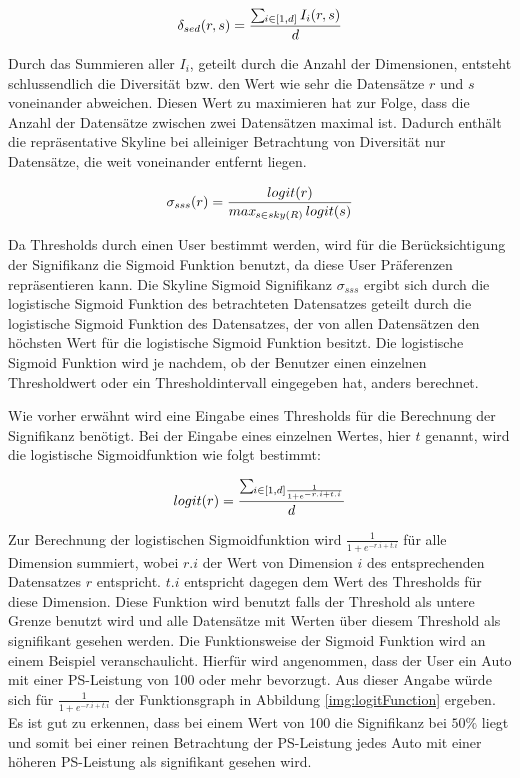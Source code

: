$$\delta_{sed}(r,s)=\frac{\sum\limits\mathop{}_{\mkern-5mu i \in{[1,d]}} I_i(r,s)}{d}$$

Durch das Summieren aller $I_i$, geteilt durch die Anzahl der Dimensionen, entsteht schlussendlich die Diversität bzw. den Wert wie sehr die Datensätze $r$ und $s$ voneinander abweichen. Diesen Wert zu maximieren hat zur Folge, dass die Anzahl der Datensätze zwischen zwei Datensätzen maximal ist. Dadurch enthält die repräsentative Skyline bei alleiniger Betrachtung von Diversität nur Datensätze, die weit voneinander entfernt liegen. 

$$\sigma_{sss}(r)=\frac{logit(r)}{max\mathop{}_{\mkern-5mu s \in{sky(R)}}logit(s)}$$

Da Thresholds durch einen User bestimmt werden, wird für die Berücksichtigung der Signifikanz die Sigmoid Funktion benutzt, da diese User Präferenzen repräsentieren kann. Die Skyline Sigmoid Signifikanz $\sigma_{sss}$ ergibt sich durch die logistische Sigmoid Funktion des betrachteten Datensatzes geteilt durch die logistische Sigmoid Funktion des Datensatzes, der von allen Datensätzen den höchsten Wert für die logistische Sigmoid Funktion besitzt. Die logistische Sigmoid Funktion wird je nachdem, ob der Benutzer einen einzelnen Thresholdwert oder ein Thresholdintervall eingegeben hat, anders berechnet.

Wie vorher erwähnt wird eine Eingabe eines Thresholds für die Berechnung der Signifikanz benötigt. Bei der Eingabe eines einzelnen Wertes, hier $t$ genannt, wird die logistische Sigmoidfunktion wie folgt bestimmt:

$$logit(r)=\frac{\sum\mathop{}_{\mkern-5mu i \in{[1,d]}\frac{1}{1+e^{-r.i+t.i}}}}{d}$$

Zur Berechnung der logistischen Sigmoidfunktion  wird $\frac{1}{1+e^{-r.i+t.i}}$ für alle Dimension summiert, wobei $r.i$ der Wert von Dimension $i$ des entsprechenden Datensatzes $r$ entspricht. $t.i$ entspricht dagegen dem Wert des Thresholds für diese Dimension. Diese Funktion wird benutzt falls der Threshold als untere Grenze benutzt wird und alle Datensätze mit Werten über diesem Threshold als signifikant gesehen werden. Die Funktionsweise der Sigmoid Funktion wird an einem Beispiel veranschaulicht. Hierfür wird angenommen, dass der User ein Auto mit einer PS-Leistung von 100 oder mehr bevorzugt. Aus dieser Angabe würde sich für $\frac{1}{1+e^{-r.i+t.i}}$ der Funktionsgraph in Abbildung \ref{img:logitFunction} ergeben. Es ist gut zu erkennen, dass bei einem Wert von 100 die Signifikanz bei $50\%$ liegt und somit bei einer reinen Betrachtung der PS-Leistung jedes Auto mit einer höheren PS-Leistung als signifikant gesehen wird.

